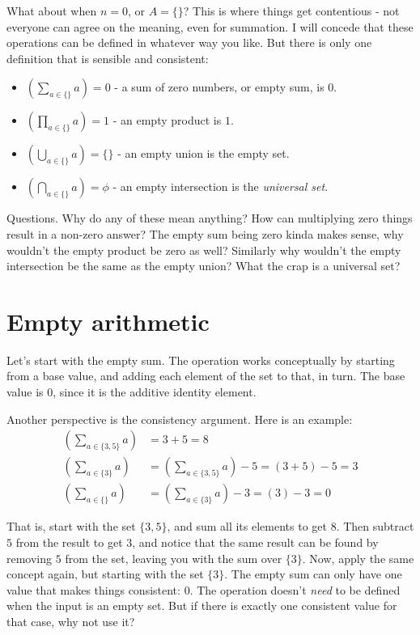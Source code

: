\documentclass{article}
\begin{document}
What about when $n = 0$, or $A=\{\}$? This is where things get contentious - not everyone can agree on the meaning, even for summation. I will concede that these operations can be defined in whatever way you like. But there is only one definition that is sensible and consistent:
\begin{itemize}
\item $\left(\sum\limits_{a\in \{\}}a\right) = 0$ - a sum of zero numbers, or empty sum, is $0$.\\
\item $\left(\prod\limits_{a\in \{\}}a\right) = 1$ - an empty product is $1$.\\
\item $\left(\bigcup\limits_{a\in \{\}}a\right) = \{\}$ - an empty union is the empty set.\\
\item $\left(\bigcap\limits_{a\in \{\}}a\right) = \phi$ - an empty intersection is the \textit{universal set}.\\
\end{itemize}

Questions. Why do any of these mean anything? How can multiplying zero things result in a non-zero answer? The empty sum being zero kinda makes sense, why wouldn't the empty product be zero as well? Similarly why wouldn't the empty intersection be the same as the empty union? What the crap is a universal set?

\section{Empty arithmetic}
Let's start with the empty sum. The operation works conceptually by starting from a base value, and adding each element of the set to that, in turn. The base value is $0$, since it is the additive identity element.

Another perspective is the consistency argument. Here is an example:
\begin{align}
\left(\sum_{a \in \{3, 5\}}a\right) &= 3 + 5 = 8\\
\left(\sum_{a \in \{3\}}a\right) &= \left(\sum_{a \in \{3, 5\}}a\right) - 5 = (3 + 5) - 5 = 3\\
\left(\sum_{a \in \{\}}a\right) &= \left(\sum_{a \in \{3\}}a\right) - 3 = (3) - 3 = 0
\end{align}

That is, start with the set $\{3, 5\}$, and sum all its elements to get $8$. Then subtract $5$ from the result to get $3$, and notice that the same result can be found by removing $5$ from the set, leaving you with the sum over $\{3\}$. Now, apply the same concept again, but starting with the set $\{3\}$. The empty sum can only have one value that makes things consistent: $0$. The operation doesn't \textit{need} to be defined when the input is an empty set. But if there is exactly one consistent value for that case, why not use it?
\end{document}
